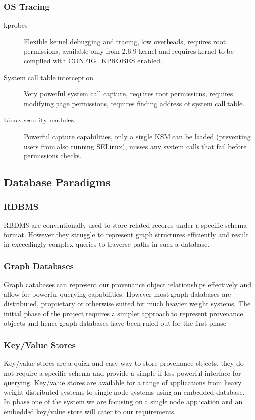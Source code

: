 \subsubsection{OS Tracing}
\begin{description}
\item[kprobes] Flexible kernel debugging and tracing, low overheads, requires root permissions, available only from 2.6.9 kernel and requires kernel to be compiled with CONFIG\_KPROBES enabled.
\item[System call table interception] Very powerful system call capture, requires root permissions, requires modifying page permissions, requires finding address of system call table.
\item[Linux security modules] Powerful capture capabilities, only a single KSM can be loaded (preventing users from also running SELinux), misses any system calls that fail before permissions checks.
\end{description}

\subsection{Database Paradigms}

\subsubsection{RDBMS}
RBDMS are conventionally used to store related records under a specific schema format. However they struggle to represent graph structures efficiently and result in exceedingly complex queries to traverse paths in such a database.

\subsubsection{Graph Databases}
Graph databases can represent our provenance object relationships effectively and allow for powerful querying capabilities. However most graph databases are distributed, proprietary or otherwise suited for much heavier weight systems. The initial phase of the project requires a simpler approach to represent provenance objects and hence graph databases have been ruled out for the first phase.

\subsubsection{Key/Value Stores}
Key/value stores are a quick and easy way to store provenance objects, they do not require a specific schema and provide a simple if less powerful interface for querying. Key/value stores are available for a range of applications from heavy weight distributed systems to single node systems using an embedded database. In phase one of the system we are focusing on a single node application and an embedded key/value store will cater to our requirements.
